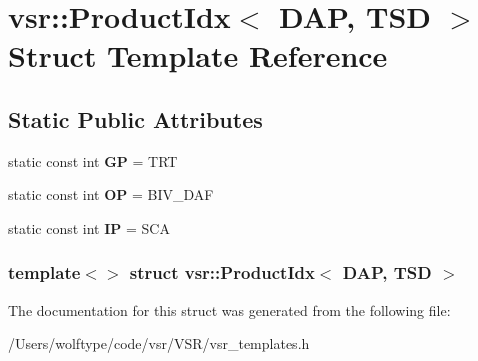 \hypertarget{structvsr_1_1_product_idx_3_01_d_a_p_00_01_t_s_d_01_4}{\section{vsr\-:\-:Product\-Idx$<$ D\-A\-P, T\-S\-D $>$ Struct Template Reference}
\label{structvsr_1_1_product_idx_3_01_d_a_p_00_01_t_s_d_01_4}
}
\subsection*{Static Public Attributes}
\begin{DoxyCompactItemize}
\item 
\hypertarget{structvsr_1_1_product_idx_3_01_d_a_p_00_01_t_s_d_01_4_a8d8c4a4693388426a968e06f93fe451d}{static const int {\bfseries G\-P} = T\-R\-T}\label{structvsr_1_1_product_idx_3_01_d_a_p_00_01_t_s_d_01_4_a8d8c4a4693388426a968e06f93fe451d}

\item 
\hypertarget{structvsr_1_1_product_idx_3_01_d_a_p_00_01_t_s_d_01_4_a587a35827ed0dc5339c24d13bb8b13b4}{static const int {\bfseries O\-P} = B\-I\-V\-\_\-\-D\-A\-F}\label{structvsr_1_1_product_idx_3_01_d_a_p_00_01_t_s_d_01_4_a587a35827ed0dc5339c24d13bb8b13b4}

\item 
\hypertarget{structvsr_1_1_product_idx_3_01_d_a_p_00_01_t_s_d_01_4_a5d0b98027eee3618a23cdbc655f8d305}{static const int {\bfseries I\-P} = S\-C\-A}\label{structvsr_1_1_product_idx_3_01_d_a_p_00_01_t_s_d_01_4_a5d0b98027eee3618a23cdbc655f8d305}

\end{DoxyCompactItemize}
\subsubsection*{template$<$$>$ struct vsr\-::\-Product\-Idx$<$ D\-A\-P, T\-S\-D $>$}



The documentation for this struct was generated from the following file\-:\begin{DoxyCompactItemize}
\item 
/\-Users/wolftype/code/vsr/\-V\-S\-R/vsr\-\_\-templates.\-h\end{DoxyCompactItemize}
